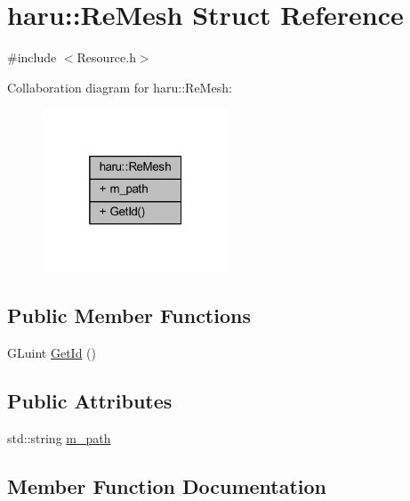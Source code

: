 \hypertarget{structharu_1_1_re_mesh}{}\section{haru\+:\+:Re\+Mesh Struct Reference}
\label{structharu_1_1_re_mesh}


{\ttfamily \#include $<$Resource.\+h$>$}



Collaboration diagram for haru\+:\+:Re\+Mesh\+:\nopagebreak
\begin{figure}[H]
\begin{center}
\leavevmode
\includegraphics[width=157pt]{structharu_1_1_re_mesh__coll__graph}
\end{center}
\end{figure}
\subsection*{Public Member Functions}
\begin{DoxyCompactItemize}
\item 
G\+Luint \mbox{\hyperlink{structharu_1_1_re_mesh_a6be6fd0e97e1e9754baa68eef4383923}{Get\+Id}} ()
\end{DoxyCompactItemize}
\subsection*{Public Attributes}
\begin{DoxyCompactItemize}
\item 
std\+::string \mbox{\hyperlink{structharu_1_1_re_mesh_ae4a023863733f58bd9dabfde91f30f05}{m\+\_\+path}}
\end{DoxyCompactItemize}


\subsection{Member Function Documentation}
\mbox{\label{structharu_1_1_re_mesh_a6be6fd0e97e1e9754baa68eef4383923}} 
